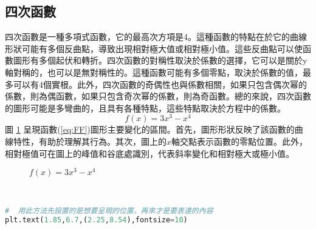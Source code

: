 \documentclass[12pt, a4paper]{article}
\begin{document}
\subsection{四次函數}
四次函數是一種多項式函數，它的最高次方項是4。這種函數的特點在於它的曲線形狀可能有多個反曲點，導致出現相對極大值或相對極小值。這些反曲點可以使函數圖形有多個起伏和轉折。四次函數的對稱性取決於係數的選擇，它可以是關於y軸對稱的，也可以是無對稱性的。這種函數可能有多個零點，取決於係數的值，最多可以有4個實根。此外，四次函數的奇偶性也與係數相關，如果只包含偶次幂的係數，則為偶函數，如果只包含奇次幂的係數，則為奇函數。總的來說，四次函數的圖形可能是多彎曲的，且具有各種特點，這些特點取決於方程中的係數。
\begin{equation}\label{eq:FF}
f(x)= 3x^3 - x^4
\end{equation}
圖 \ref{fig:FF} 呈現函數(\ref{eq:FF})圖形主要變化的區間。首先，圖形形狀反映了該函數的曲線特性，有助於理解其行為。其次，圖上的$x$軸交點表示函數的零點位置。此外，相對極值可在圖上的峰值和谷底處識別，代表斜率變化和相對極大或極小值。\\
\begin{figure}[h]
    \caption{$f(x)=3x^3 - x^4$}
    \label{fig:FF}
\end{figure}\\
\begin{lstlisting}[language=Python]
#  用此方法先設置的是想要呈現的位置，再來才是要表達的內容
plt.text(1.85,6.7,(2.25,8.54),fontsize=10)
\end{lstlisting}
\end{document}
